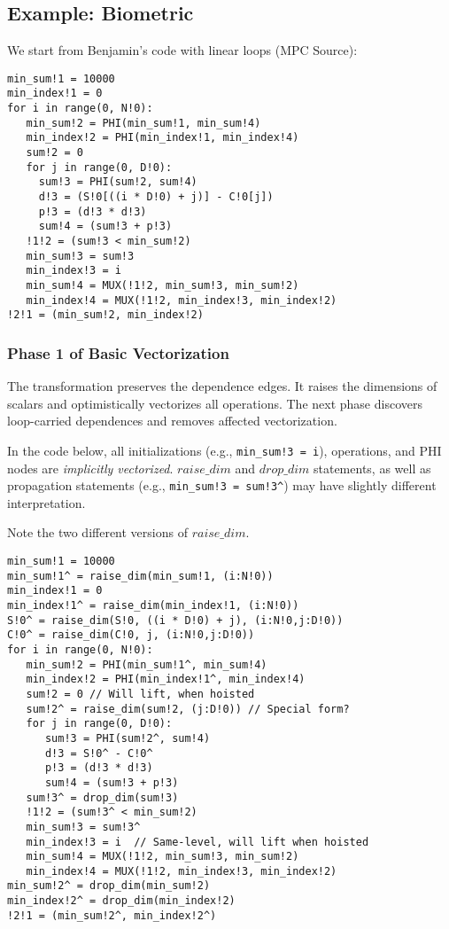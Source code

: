 
%

\subsection{Example: Biometric}

We start from Benjamin's code with linear loops (MPC Source):

{\small
\begin{verbatim}
min_sum!1 = 10000
min_index!1 = 0
for i in range(0, N!0):
   min_sum!2 = PHI(min_sum!1, min_sum!4)
   min_index!2 = PHI(min_index!1, min_index!4)
   sum!2 = 0
   for j in range(0, D!0):
     sum!3 = PHI(sum!2, sum!4)
     d!3 = (S!0[((i * D!0) + j)] - C!0[j])
     p!3 = (d!3 * d!3)
     sum!4 = (sum!3 + p!3)
   !1!2 = (sum!3 < min_sum!2)
   min_sum!3 = sum!3
   min_index!3 = i
   min_sum!4 = MUX(!1!2, min_sum!3, min_sum!2)
   min_index!4 = MUX(!1!2, min_index!3, min_index!2)
!2!1 = (min_sum!2, min_index!2)   
\end{verbatim}
}

\subsubsection{Phase 1 of Basic Vectorization}

The transformation preserves the dependence edges. It raises the dimensions of scalars and optimistically vectorizes all operations. 
The next phase discovers loop-carried dependences and removes affected vectorization.

In the code below, all initializations (e.g., \texttt{min\_sum!3 = i}), operations, and PHI nodes are \emph{implicitly vectorized}. 
$\mathit{raise\_dim}$ and $\mathit{drop\_dim}$ statements, as well as propagation statements (e.g., \texttt{min\_sum!3 = sum!3\^}) 
may have slightly different interpretation. 

Note the two different versions of $\mathit{raise\_dim}$. 

{\small
\begin{verbatim}
min_sum!1 = 10000
min_sum!1^ = raise_dim(min_sum!1, (i:N!0))
min_index!1 = 0
min_index!1^ = raise_dim(min_index!1, (i:N!0))
S!0^ = raise_dim(S!0, ((i * D!0) + j), (i:N!0,j:D!0))
C!0^ = raise_dim(C!0, j, (i:N!0,j:D!0))
for i in range(0, N!0):
   min_sum!2 = PHI(min_sum!1^, min_sum!4)
   min_index!2 = PHI(min_index!1^, min_index!4) 
   sum!2 = 0 // Will lift, when hoisted
   sum!2^ = raise_dim(sum!2, (j:D!0)) // Special form?
   for j in range(0, D!0):
      sum!3 = PHI(sum!2^, sum!4)
      d!3 = S!0^ - C!0^
      p!3 = (d!3 * d!3) 
      sum!4 = (sum!3 + p!3)
   sum!3^ = drop_dim(sum!3)     
   !1!2 = (sum!3^ < min_sum!2)
   min_sum!3 = sum!3^
   min_index!3 = i  // Same-level, will lift when hoisted
   min_sum!4 = MUX(!1!2, min_sum!3, min_sum!2)
   min_index!4 = MUX(!1!2, min_index!3, min_index!2)
min_sum!2^ = drop_dim(min_sum!2)
min_index!2^ = drop_dim(min_index!2)   
!2!1 = (min_sum!2^, min_index!2^)     
\end{verbatim}
}

